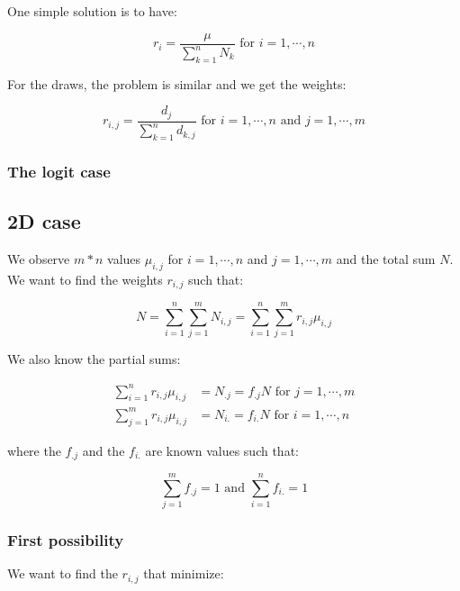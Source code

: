 One simple solution is to have:

\begin{equation*}
r_i = \frac{\mu}{\sum_{k = 1}^n N_k} \text{ for } i = 1 , \cdots , n
\end{equation*}

For the draws, the problem is similar and we get the weights:

\begin{equation*}
r_{i,j} = \frac{d_j}{\sum_{k = 1}^n d_{k,j}} \text{ for } i = 1 , \cdots , n \text{ and } j = 1 , \cdots , m
\end{equation*}

\subsubsection{The logit case}

\subsection{2D case}

We observe $m * n$ values $\mu_{i,j}$ for $i = 1 , \cdots , n$ and $j = 1 , \cdots , m$ and the total sum $N$. We want to find the weights $r_{i,j}$ such that:

\begin{equation*}
N = \sum_{i = 1}^n \sum_{j = 1}^m N_{i,j} = \sum_{i = 1}^n \sum_{j = 1}^m r_{i,j} \mu_{i,j}
\end{equation*}

We also know the partial sums:

\begin{align*}
\sum_{i = 1}^n r_{i,j} \mu_{i,j} &= N_{.j} = f_{.j} N \text{ for } j = 1 , \cdots , m \\
\sum_{j = 1}^m r_{i,j} \mu_{i,j} &= N_{i.} = f_{i.} N \text{ for } i = 1 , \cdots , n
\end{align*}

where the $f_{.j}$ and the $f_{i.}$ are known values such that:

\begin{equation*}
\sum_{j = 1}^m f_{.j} = 1 \text{ and } \sum_{i = 1}^n f_{i.} = 1
\end{equation*}

\subsubsection{First possibility}

We want to find the $r_{i,j}$ that minimize:

